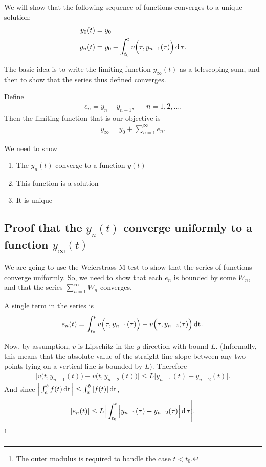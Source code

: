 We will show that the following sequence of functions converges to a unique
solution:
\begin{align*}
  y_0(t) &= y_0\\
  y_n(t) &= y_0 + \int_{t_0}^t v\Big(\tau, y_{n-1}(\tau)\Big) \operatorname{\text{d}}\tau.\\
\end{align*}

The basic idea is to write the limiting function $y_\infty(t)$ as a telescoping
sum, and then to show that the series thus defined converges.

Define
\begin{align*}
  e_n = y_n - y_{n-1}, ~~~~~~~ n = 1, 2, \ldots.
\end{align*}
Then the limiting function that is our objective is
\begin{align*}
  y_\infty = y_0 + \sum_{n=1}^\infty e_n.
\end{align*}

We need to show
\begin{enumerate}
\item The $y_n(t)$ converge to a function $y(t)$
\item This function is a solution
\item It is unique
\end{enumerate}

\newpage
\subsection{Proof that the $y_n(t)$ converge uniformly to a function $y_\infty(t)$}
We are going to use the Weierstrass M-test to show that the series of functions
converge uniformly. So, we need to show that each $e_n$ is bounded
by some $W_n$, and that the series $\sum_{n=1}^\infty W_n$ converges.

A single term in the series is
\begin{align*}
  e_{n}(t) = \int_{t_0}^t v\Big(\tau, y_{n-1}(\tau)\Big) -
                         v\Big(\tau, y_{n-2}(\tau)\Big) \operatorname{\text{dt}}.
\end{align*}

Now, by assumption, $v$ is Lipschitz in the $y$ direction with bound
$L$. (Informally, this means that the absolute value of the straight line slope
between any two points lying on a vertical line is bounded by $L$). Therefore
\begin{align*}
  \Big|v\Big(t, y_{n-1}(t)\Big) -
       v\Big(t, y_{n-2}(t)\Big)\Big| \leq L\Big|y_{n-1}(t) - y_{n-2}(t)\Big|.
\end{align*}
And since $\Big|\int_a^b f(t) \operatorname{\text{dt}}\Big| \leq \int_a^b |f(t)| \operatorname{\text{dt}}$,
\begin{align*}
  |e_n(t)| \leq L\Big|\int_{t_0}^t \Big|y_{n-1}(\tau) - y_{n-2}(\tau)\Big| \operatorname{\text{d}}\tau \Bigg|.
\end{align*}
\footnote{The outer modulus is required to handle the case $t < t_0$.}

